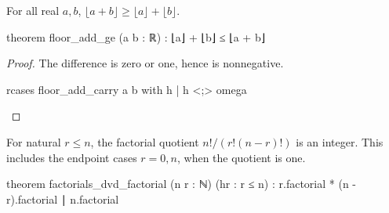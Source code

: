 \begin{theorem}
  \label{ent:thm:floor-add-ge}
  For all real $a,b$, $\lfloor a+b\rfloor\ge\lfloor a\rfloor+\lfloor b\rfloor$.

  \begin{lean}
    theorem floor_add_ge (a b : ℝ) : ⌊a⌋ + ⌊b⌋ ≤ ⌊a + b⌋
  \end{lean}
\end{theorem}

\begin{proof}
  The difference is zero or one, hence is nonnegative.

  \begin{lean}
    rcases floor_add_carry a b with h | h <;> omega
  \end{lean}
\end{proof}

\begin{theorem}
  \label{ent:thm:factorials-dvd-factorial}
  For natural $r\le n$, the factorial quotient $n!
    /(r!(n-r)!)$ is an integer.
  This includes the endpoint cases $r=0,n$, when the quotient is one.

  \begin{lean}
    theorem factorials_dvd_factorial (n r : ℕ) (hr : r ≤ n) :
        r.factorial * (n - r).factorial ∣ n.factorial
  \end{lean}
\end{theorem}

